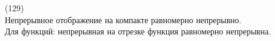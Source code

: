 (129)\\
Непрерывное отображение на компакте равномерно непрерывно.\\
Для функций: непрерывная на отрезке функция равномерно непрерывна.